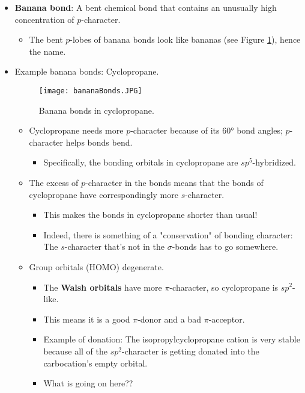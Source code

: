 \documentclass[../notes.tex]{subfiles}
\begin{document}
\begin{itemize}
    \item \textbf{Banana bond}: A bent chemical bond that contains an unusually high concentration of $p$-character.
    \begin{itemize}
        \item The bent $p$-lobes of banana bonds look like bananas (see Figure \ref{fig:bananaBonds}), hence the name.
    \end{itemize}
    \item Example banana bonds: Cyclopropane.
    \begin{figure}[h!]
        \centering
        \texttt{[image: bananaBonds.JPG]}
        \caption{Banana bonds in cyclopropane.}
        \label{fig:bananaBonds}
    \end{figure}
    \begin{itemize}
        \item Cyclopropane needs more $p$-character because of its \ang{60} bond angles; $p$-character helps bonds bend.
        \begin{itemize}
            \item Specifically, the  bonding orbitals in cyclopropane are $sp^5$-hybridized.
        \end{itemize}
        \item The excess of $p$-character in the  bonds means that the  bonds of cyclopropane have correspondingly more $s$-character.
        \begin{itemize}
            \item This makes the  bonds in cyclopropane shorter than usual!
            \item Indeed, there is something of a "conservation" of bonding character: The $s$-character that's not in the $\sigma$-bonds has to go somewhere.
        \end{itemize}
        \item Group orbitals (HOMO) degenerate.
        \begin{itemize}
            \item The \textbf{Walsh orbitals} have more $\pi$-character, so cyclopropane is $sp^2$-like.
            \item This means it is a good $\pi$-donor and a bad $\pi$-acceptor.
            \item Example of donation: The isopropylcyclopropane cation is very stable because all of the $sp^2$-character is getting donated into the carbocation's empty orbital.
            \item What is going on here??

\end{itemize}
\end{itemize}
\end{itemize}
\end{document}
